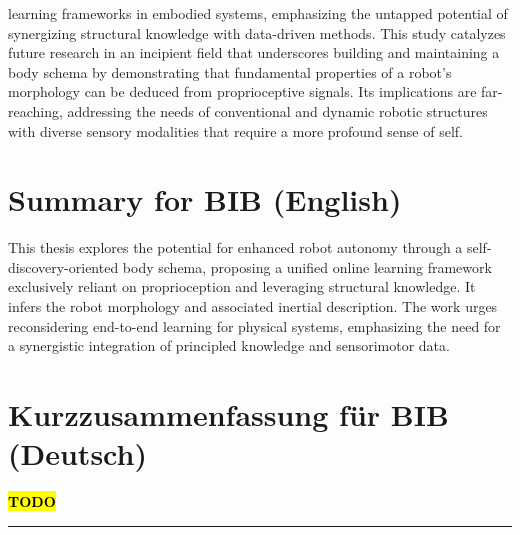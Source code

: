 \documentclass[12pt, a4paper]{article}
\newcommand{\TODO}{\hl{\textbf{TODO}}}
\begin{document}
learning frameworks in embodied systems, emphasizing the untapped potential of synergizing structural knowledge with data-driven methods. This study catalyzes future research in an incipient field that underscores building and maintaining a body schema by demonstrating that fundamental properties of a robot's morphology can be deduced from proprioceptive signals. Its implications are far-reaching, addressing the needs of conventional and dynamic robotic structures with diverse sensory modalities that require a more profound sense of self.

\section*{Summary for BIB (English)}
This thesis explores the potential for enhanced robot autonomy through a self-discovery-oriented body schema, proposing a unified online learning framework exclusively reliant on proprioception and leveraging structural knowledge. It infers the robot morphology and associated inertial description. The work urges reconsidering end-to-end learning for physical systems, emphasizing the need for a synergistic integration of principled knowledge and sensorimotor data.

\section*{Kurzzusammenfassung für BIB (Deutsch)}
\TODO

\rule{\textwidth}{0.4pt}
\end{document}

